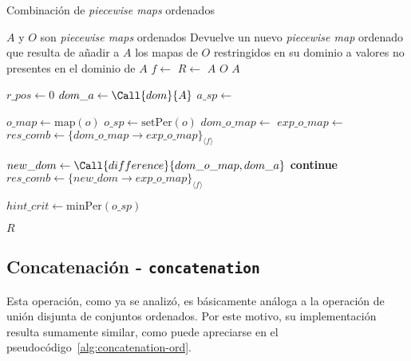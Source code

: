 \begin{algorithm}
\caption{Combinación de \textit{piecewise maps} ordenados}
\label{alg:combine-ord}
\begin{algorithmic}[1]
\Require $A$ y $O$ son \textit{piecewise maps} ordenados
\Ensure Devuelve un nuevo \textit{piecewise map} ordenado que resulta de añadir a $A$ los mapas de $O$ restringidos en su dominio a valores no presentes en el dominio de $A$
    \State $f \gets$ 
    \State $R \gets$ $A$            
        \State \Return $O$
    \EndIf
        \State \Return $A$
    \EndIf

    \State $r\_pos \gets 0$
    \State $dom\_a \gets \Call{dom}{A}$
    \State $a\_sp \gets$ 

        \State $o\_map \gets \mathrm{map}(o)$
        \State $o\_sp \gets \mathrm{setPer}(o)$
        \State $dom\_o\_map \gets$ 
        \State $exp\_o\_map \gets$ 
        \State $res\_comb \gets\{dom\_o\_map \rightarrow exp\_o\_map\}_{\langle f \rangle}$

            \State $new\_dom \gets \Call{difference}{dom\_o\_map,dom\_a}$
                \State \textbf{continue}
            \EndIf
            \State $res\_comb \gets\{new\_dom \rightarrow exp\_o\_map\}_{\langle f \rangle}$ 
        \EndIf

        \State $hint\_crit \gets \mathrm{minPer}(o\_sp)$
        \State {}
        \State {}
    \EndFor

    \State \Return $R$
\EndFunction
\end{algorithmic}
\end{algorithm}


\subsection{Concatenación - \texttt{concatenation}}

Esta operación, como ya se analizó, es básicamente análoga a la operación 
de unión disjunta de conjuntos ordenados.  
Por este motivo, su implementación resulta sumamente similar, 
como puede apreciarse en el pseudocódigo~\ref{alg:concatenation-ord}.


